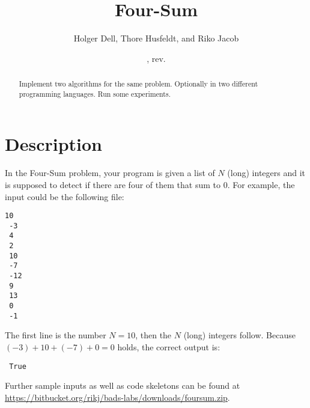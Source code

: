 \documentclass{tufte-handout}
\title{Four-Sum}
\author{Holger Dell, Thore Husfeldt, and Riko Jacob}
\date{\GITAuthorDate, rev. \GITAbrHash}
\begin{document}
\maketitle
\begin{abstract}
  Implement two algorithms for the same problem.
  Optionally in two different programming languages.
  Run some experiments.
\end{abstract}


 \section{Description}

 In the Four-Sum problem, your program is given a list of $N$ (long) integers and it is supposed to detect if there are four of them that sum to $0$.
 For example, the input could be the following file:
 \begin{lstlisting}[language=None]
 10
 -3
 4
 2
 10
 -7
 -12
 9
 13
 0
 -1
 \end{lstlisting}
 The first line is the number $N=10$, then the $N$ (long) integers follow.
 Because $(-3)+10+(-7)+0 = 0$ holds, the correct output is:
 \begin{lstlisting}
 True
 \end{lstlisting}

 Further sample inputs as well as code skeletons can be found at \url{https://bitbucket.org/rikj/bads-labs/downloads/foursum.zip}.
\end{document}
